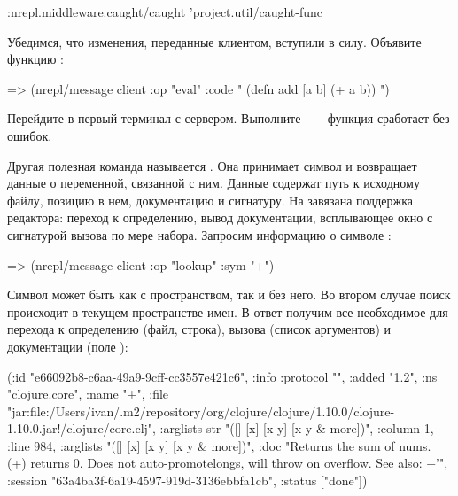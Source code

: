 \begin{english}
  \begin{clojure}
{:nrepl.middleware.caught/caught 'project.util/caught-func}
  \end{clojure}
\end{english}

Убедимся, что изменения, переданные клиентом, вступили в силу. Объявите функцию :

\begin{english}
  \begin{clojure}
=> (nrepl/message client {:op "eval" :code "
(defn add [a b]
  (+ a b))
"})
  \end{clojure}
\end{english}

Перейдите в первый терминал с сервером. Выполните ~--- функция сработает без ошибок.

Другая полезная команда называется . Она принимает символ и возвращает данные о переменной, связанной с ним. Данные содержат путь к исходному файлу, позицию в нем, документацию и сигнатуру. На  завязана поддержка редактора: переход к определению, вывод документации, всплывающее окно с сигнатурой вызова по мере набора. Запросим информацию о символе \code{+}:

\begin{english}
  \begin{clojure}
=> (nrepl/message client {:op "lookup" :sym "+"})
  \end{clojure}
\end{english}

Символ может быть как с пространством, так и без него. Во втором случае поиск происходит в текущем пространстве имен. В ответ получим все необходимое для перехода к определению (файл, строка), вызова (список аргументов) и документации (поле ):

\begin{english}
  \begin{clojure}
({:id "e66092b8-c6aa-49a9-9cff-cc3557e421c6",
  :info {:protocol "",
         :added "1.2",
         :ns "clojure.core",
         :name "+",
         :file "jar:file:/Users/ivan/.m2/repository/org/clojure/clojure/1.10.0/clojure-1.10.0.jar!/clojure/core.clj",
         :arglists-str "([] [x] [x y] [x y & more])",
         :column 1,
         :line 984,
         :arglists "([] [x] [x y] [x y & more])",
         :doc "Returns the sum of nums. (+) returns 0. Does not auto-promote\n  longs, will throw on overflow. See also: +'"},
  :session "63a4ba3f-6a19-4597-919d-3136ebbfa1cb",
  :status ["done"]})
  \end{clojure}
\end{english}

